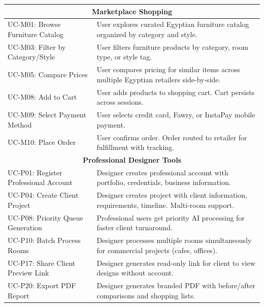 \begin{longtable}{p{3.5cm}p{10cm}}
\multicolumn{2}{c}{\textbf{Marketplace Shopping}} \\
\midrule
UC-M01: Browse Furniture Catalog & User explores curated Egyptian furniture catalog organized by category and style. \\
UC-M03: Filter by Category/Style & User filters furniture products by category, room type, or style tag. \\
UC-M05: Compare Prices & User compares pricing for similar items across multiple Egyptian retailers side-by-side. \\
UC-M08: Add to Cart & User adds products to shopping cart. Cart persists across sessions. \\
UC-M09: Select Payment Method & User selects credit card, Fawry, or InstaPay mobile payment. \\
UC-M10: Place Order & User confirms order. Order routed to retailer for fulfillment with tracking. \\
\midrule

\multicolumn{2}{c}{\textbf{Professional Designer Tools}} \\
\midrule
UC-P01: Register Professional Account & Designer creates professional account with portfolio, credentials, business information. \\
UC-P04: Create Client Project & Designer creates project with client information, requirements, timeline. Multi-room support. \\
UC-P08: Priority Queue Generation & Professional users get priority AI processing for faster client turnaround. \\
UC-P10: Batch Process Rooms & Designer processes multiple rooms simultaneously for commercial projects (cafes, offices). \\
UC-P17: Share Client Preview Link & Designer generates read-only link for client to view designs without account. \\
UC-P20: Export PDF Report & Designer generates branded PDF with before/after comparisons and shopping lists. \\

\end{longtable}

